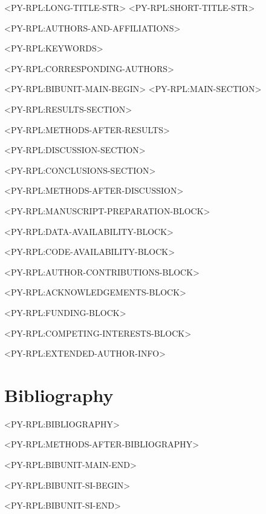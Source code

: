 \documentclass[times, twoside]{rxiv_maker_style}
\begin{document}
<PY-RPL:LONG-TITLE-STR>
<PY-RPL:SHORT-TITLE-STR>

<PY-RPL:AUTHORS-AND-AFFILIATIONS>

\maketitle

\begin{abstract}

<PY-RPL:ABSTRACT>

\end{abstract}

<PY-RPL:KEYWORDS>

<PY-RPL:CORRESPONDING-AUTHORS>

<PY-RPL:BIBUNIT-MAIN-BEGIN>
<PY-RPL:MAIN-SECTION>

<PY-RPL:RESULTS-SECTION>

<PY-RPL:METHODS-AFTER-RESULTS>

<PY-RPL:DISCUSSION-SECTION>

<PY-RPL:CONCLUSIONS-SECTION>

<PY-RPL:METHODS-AFTER-DISCUSSION>

\vspace{1em}

<PY-RPL:MANUSCRIPT-PREPARATION-BLOCK>

<PY-RPL:DATA-AVAILABILITY-BLOCK>

<PY-RPL:CODE-AVAILABILITY-BLOCK>

<PY-RPL:AUTHOR-CONTRIBUTIONS-BLOCK>

<PY-RPL:ACKNOWLEDGEMENTS-BLOCK>

<PY-RPL:FUNDING-BLOCK>

<PY-RPL:COMPETING-INTERESTS-BLOCK>

\begin{exauthor}
<PY-RPL:EXTENDED-AUTHOR-INFO>
\end{exauthor}

\section*{Bibliography}
<PY-RPL:BIBLIOGRAPHY>

<PY-RPL:METHODS-AFTER-BIBLIOGRAPHY>

<PY-RPL:BIBUNIT-MAIN-END>

\onecolumn
\newpage


<PY-RPL:BIBUNIT-SI-BEGIN>

<PY-RPL:BIBUNIT-SI-END>
\end{document}
